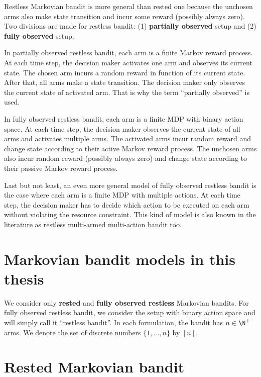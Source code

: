 Restless Markovian bandit is more general than rested one because
the unchosen arms also make state transition and incur some reward (possibly always zero).
Two divisions are made for restless bandit: (1) \textbf{partially observed} setup and (2) \textbf{fully observed} setup.

In partially observed restless bandit, each arm is a finite Markov reward process.
At each time step, the decision maker activates one arm and observes its current state.
The chosen arm incurs a random reward in function of its current state.
After that, all arms make a state transition.
The decision maker only observes the current state of activated arm.
That is why the term ``partially observed'' is used.

In fully observed restless bandit, each arm is a finite MDP with binary action space.
At each time step, the decision maker observes the current state of all arms and activates multiple arms.
The activated arms incur random reward and change state according to their active Markov reward process.
The unchosen arms also incur random reward (possibly always zero) and change state according to their passive Markov reward process.

Last but not least, an even more general model of fully observed restless bandit is the case where each arm is a finite MDP with multiple actions.
At each time step, the decision maker has to decide which action to be executed on each arm without violating the resource constraint.
This kind of model is also known in the literature as restless multi-armed multi-action bandit too.

\section{Markovian bandit models in this thesis}

We consider only \textbf{rested} and \textbf{fully observed restless} Markovian bandits.
For fully observed restless bandit, we consider the setup with binary action space and will simply call it ``restless bandit''.
In each formulation, the bandit has $n\in\N^+$ arms.
We denote the set of discrete numbers $\{1,\dots,n\}$ by $[n]$.

\section{Rested Markovian bandit}
\label{sec:rested_mab}


